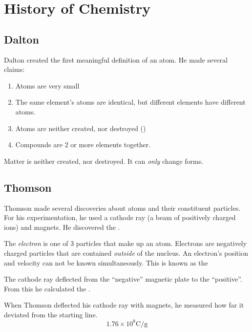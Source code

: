 \section{History of Chemistry} \label{sec:History of Chemistry}
\subsection{Dalton} \label{subsec:Dalton}
Dalton created the first meaningful definition of an atom.
He made several claims:
\begin{enumerate}
\item Atoms are very small
\item The same element's atoms are identical, but different elements have different atoms.
\item Atoms are neither created, nor destroyed ()
\item Compounds are 2 or more elements together.
\end{enumerate}

\begin{definition} \label{def:Law of Conservation of Matter}
  Matter is neither created, nor destroyed.
  It can \emph{only} change forms.
\end{definition}

\subsection{Thomson} \label{subsec:Thomson}
Thomson made several discoveries about atoms and their constituent particles.
For his experimentation, he used a cathode ray (a beam of positively charged ions) and magnets.
He discovered the .

\begin{definition}[Electron] \label{def:Electron}
  The \emph{electron} is one of 3 particles that make up an atom.
  Electrons are negatively charged particles that are contained \emph{outside} of the nucleus.
  An electron's position and velocity can not be known simultaneously.
  This is known as the 
\end{definition}
The cathode ray deflected from the ``negative'' magnetic plate to the ``positive''.
From this he calculated the .

\begin{definition} \label{def:Magnetic Deflection}
  When Thomson deflected his cathode ray with magnets, he measured how far it deviated from the starting line.
  \begin{equation} \label{eq:Magnetic Deflection}
    1.76 \times 10^{8} \si{\coulomb / \gram}
  \end{equation}
\end{definition}

